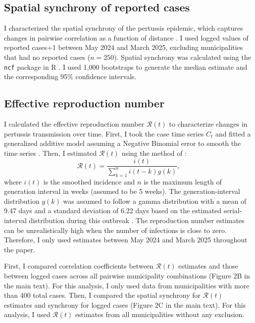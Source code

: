 \documentclass[12pt]{article}
\begin{document}
\subsection*{Spatial synchrony of reported cases}

I characterized the spatial synchrony of the pertussis epidemic, which captures changes in pairwise correlation as a function of distance \citep{grenfell2001travelling}. 
I used logged values of reported cases+1 between May 2024 and March 2025, excluding municipalities that had no reported cases ($n=250$).
Spatial synchrony was calculated using the \texttt{ncf} package in R \citep{ncf}.
I used 1,000 bootstraps to generate the median estimate and the corresponding 95\% confidence intervals.

\subsection*{Effective reproduction number}

I calculated the effective reproduction number $\mathcal R(t)$ to characterize changes in pertussis transmission over time. 
First, I took the case time series $C_t$ and fitted a generalized additive model assuming a Negative Binomial error to smooth the time series \citep{wood2017generalized}. 
Then, I estimated $\mathcal R(t)$ using the method of \citep{cori2013new}:
\begin{equation}
\mathcal R(t) = \frac{i(t)}{\sum_{k=1}^n i(t-k) g(k)},
\end{equation}
where $i(t)$ is the smoothed incidence and $n$ is the maximum length of generation interval in weeks (assumed to be 5 weeks).
The generation-interval distribution $g(k)$ was assumed to follow a gamma distribution with a mean of 9.47 days and a standard deviation of 6.22 days based on the estimated serial-interval distribution during this outbreak \citep{cho2025transmission}.
The reproduction number estimates can be unrealistically high when the number of infections is close to zero. 
Therefore, I only used estimates between May 2024 and March 2025 throughout the paper.

First, I compared correlation coefficients between $\mathcal R(t)$ estimates and those between logged cases across all pairwise municipality combinations (Figure 2B in the main text).
For this analysis, I only used data from municipalities with more than 400 total cases.
Then, I compared the spatial synchrony for $\mathcal R(t)$ estimates and synchrony for logged cases (Figure 2C in the main text).
For this analysis, I used $\mathcal R(t)$ estimates from all municipalities without any exclusion.
\end{document}
